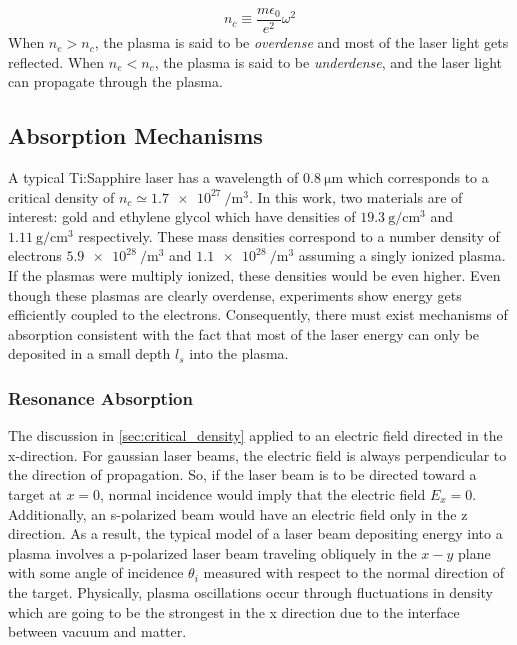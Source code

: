 \begin{equation}
	n_c \equiv \frac{m \epsilon_0}{e^2} \omega^2 \label{eq:criticaldensity}
\end{equation}
When $n_e > n_c$, the plasma is said to be \emph{overdense} and most of the laser light gets reflected. When $n_e < n_c$, the plasma is said to be \emph{underdense}, and the laser light can propagate through the plasma. 

\subsection{Absorption Mechanisms}
A typical Ti:Sapphire laser has a wavelength of $\SI{0.8}{\micro \meter}$ which corresponds to a critical density of $n_c \simeq \SI{1.7e27}{\per \meter \cubed}$. In this work, two materials are of interest: gold and ethylene glycol which have densities of $\SI{19.3}{\gram \per \centi \meter \cubed}$ and $\SI{1.11}{\gram \per \centi \meter \cubed}$ respectively. These mass densities correspond to a number density of electrons $\SI{5.9e28}{\per \meter \cubed}$ and $\SI{1.1e28}{\per \meter \cubed}$ assuming a singly ionized plasma. If the plasmas were multiply ionized, these densities would be even higher. Even though these plasmas are clearly overdense, experiments show energy gets efficiently coupled to the electrons. Consequently, there must exist mechanisms of absorption consistent with the fact that most of the laser energy can only be deposited in a small depth $l_s$ into the plasma. 

\subsubsection{Resonance Absorption}

The discussion in \autoref{sec:critical_density} applied to an electric field directed in the x-direction. For gaussian laser beams, the electric field is always perpendicular to the direction of propagation. So, if the laser beam is to be directed toward a target at $x = 0$, normal incidence would imply that the electric field $E_x = 0$. Additionally, an s-polarized beam would have an electric field only in the z direction. As a result, the typical model of a laser beam depositing energy into a plasma involves a p-polarized laser beam traveling obliquely in the $x-y$ plane with some angle of incidence $\theta_i$ measured with respect to the normal direction of the target. Physically, plasma oscillations occur through fluctuations in density which are going to be the strongest in the x direction due to the interface between vacuum and matter.


